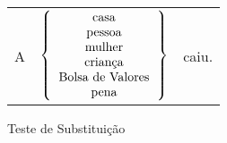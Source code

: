 \begin{figure}[h!]
    \centering
    \begin{tabular}{c c c}
        A &
        \begin{math}
            \left \{
                \begin{tabular}{c}
                    casa\\
                    pessoa\\
                    mulher\\
                    criança\\
                    Bolsa de Valores\\
                    pena\\
                \end{tabular}
            \right \}
        \end{math}
            & caiu.\\
    \end{tabular}
    
    \caption[Teste de Substituição]{Teste de Substituição}
    \label{fig:substTest}
\end{figure}